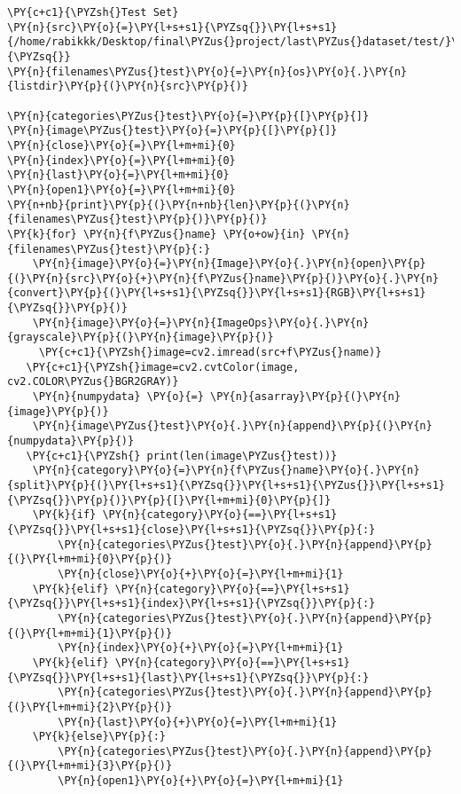     \begin{tcolorbox}[breakable, size=fbox, boxrule=1pt, pad at break*=1mm,colback=cellbackground, colframe=cellborder]
\begin{Verbatim}[commandchars=\\\{\}]
\PY{c+c1}{\PYZsh{}Test Set}
\PY{n}{src}\PY{o}{=}\PY{l+s+s1}{\PYZsq{}}\PY{l+s+s1}{/home/rabikkk/Desktop/final\PYZus{}project/last\PYZus{}dataset/test/}\PY{l+s+s1}{\PYZsq{}}
\PY{n}{filenames\PYZus{}test}\PY{o}{=}\PY{n}{os}\PY{o}{.}\PY{n}{listdir}\PY{p}{(}\PY{n}{src}\PY{p}{)}

\PY{n}{categories\PYZus{}test}\PY{o}{=}\PY{p}{[}\PY{p}{]}
\PY{n}{image\PYZus{}test}\PY{o}{=}\PY{p}{[}\PY{p}{]}
\PY{n}{close}\PY{o}{=}\PY{l+m+mi}{0}
\PY{n}{index}\PY{o}{=}\PY{l+m+mi}{0}
\PY{n}{last}\PY{o}{=}\PY{l+m+mi}{0}
\PY{n}{open1}\PY{o}{=}\PY{l+m+mi}{0}
\PY{n+nb}{print}\PY{p}{(}\PY{n+nb}{len}\PY{p}{(}\PY{n}{filenames\PYZus{}test}\PY{p}{)}\PY{p}{)}
\PY{k}{for} \PY{n}{f\PYZus{}name} \PY{o+ow}{in} \PY{n}{filenames\PYZus{}test}\PY{p}{:}
    \PY{n}{image}\PY{o}{=}\PY{n}{Image}\PY{o}{.}\PY{n}{open}\PY{p}{(}\PY{n}{src}\PY{o}{+}\PY{n}{f\PYZus{}name}\PY{p}{)}\PY{o}{.}\PY{n}{convert}\PY{p}{(}\PY{l+s+s1}{\PYZsq{}}\PY{l+s+s1}{RGB}\PY{l+s+s1}{\PYZsq{}}\PY{p}{)}
    \PY{n}{image}\PY{o}{=}\PY{n}{ImageOps}\PY{o}{.}\PY{n}{grayscale}\PY{p}{(}\PY{n}{image}\PY{p}{)}
     \PY{c+c1}{\PYZsh{}image=cv2.imread(src+f\PYZus{}name)}
   \PY{c+c1}{\PYZsh{}image=cv2.cvtColor(image, cv2.COLOR\PYZus{}BGR2GRAY)}
    \PY{n}{numpydata} \PY{o}{=} \PY{n}{asarray}\PY{p}{(}\PY{n}{image}\PY{p}{)}
    \PY{n}{image\PYZus{}test}\PY{o}{.}\PY{n}{append}\PY{p}{(}\PY{n}{numpydata}\PY{p}{)}
   \PY{c+c1}{\PYZsh{} print(len(image\PYZus{}test))}
    \PY{n}{category}\PY{o}{=}\PY{n}{f\PYZus{}name}\PY{o}{.}\PY{n}{split}\PY{p}{(}\PY{l+s+s1}{\PYZsq{}}\PY{l+s+s1}{\PYZus{}}\PY{l+s+s1}{\PYZsq{}}\PY{p}{)}\PY{p}{[}\PY{l+m+mi}{0}\PY{p}{]}
    \PY{k}{if} \PY{n}{category}\PY{o}{==}\PY{l+s+s1}{\PYZsq{}}\PY{l+s+s1}{close}\PY{l+s+s1}{\PYZsq{}}\PY{p}{:}
        \PY{n}{categories\PYZus{}test}\PY{o}{.}\PY{n}{append}\PY{p}{(}\PY{l+m+mi}{0}\PY{p}{)}
        \PY{n}{close}\PY{o}{+}\PY{o}{=}\PY{l+m+mi}{1}  
    \PY{k}{elif} \PY{n}{category}\PY{o}{==}\PY{l+s+s1}{\PYZsq{}}\PY{l+s+s1}{index}\PY{l+s+s1}{\PYZsq{}}\PY{p}{:} 
        \PY{n}{categories\PYZus{}test}\PY{o}{.}\PY{n}{append}\PY{p}{(}\PY{l+m+mi}{1}\PY{p}{)}
        \PY{n}{index}\PY{o}{+}\PY{o}{=}\PY{l+m+mi}{1} 
    \PY{k}{elif} \PY{n}{category}\PY{o}{==}\PY{l+s+s1}{\PYZsq{}}\PY{l+s+s1}{last}\PY{l+s+s1}{\PYZsq{}}\PY{p}{:} 
        \PY{n}{categories\PYZus{}test}\PY{o}{.}\PY{n}{append}\PY{p}{(}\PY{l+m+mi}{2}\PY{p}{)}
        \PY{n}{last}\PY{o}{+}\PY{o}{=}\PY{l+m+mi}{1}
    \PY{k}{else}\PY{p}{:}
        \PY{n}{categories\PYZus{}test}\PY{o}{.}\PY{n}{append}\PY{p}{(}\PY{l+m+mi}{3}\PY{p}{)}
        \PY{n}{open1}\PY{o}{+}\PY{o}{=}\PY{l+m+mi}{1}



\end{Verbatim}
\end{tcolorbox}
